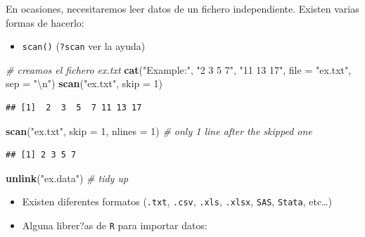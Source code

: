 \documentclass[]{book}
\newenvironment{Shaded}{\begin{snugshade}}{\end{snugshade}}
\newcommand{\KeywordTok}[1]{\textcolor[rgb]{0.13,0.29,0.53}{\textbf{#1}}}
\newcommand{\DataTypeTok}[1]{\textcolor[rgb]{0.13,0.29,0.53}{#1}}
\newcommand{\DecValTok}[1]{\textcolor[rgb]{0.00,0.00,0.81}{#1}}
\newcommand{\CharTok}[1]{\textcolor[rgb]{0.31,0.60,0.02}{#1}}
\newcommand{\StringTok}[1]{\textcolor[rgb]{0.31,0.60,0.02}{#1}}
\newcommand{\CommentTok}[1]{\textcolor[rgb]{0.56,0.35,0.01}{\textit{#1}}}
\newcommand{\NormalTok}[1]{#1}
\providecommand{\tightlist}{%
  \setlength{\itemsep}{0pt}\setlength{\parskip}{0pt}}
\begin{document}
En ocasiones, necesitaremos leer datos de un fichero independiente.
Existen varias formas de hacerlo:

\begin{itemize}
\tightlist
\item
  \texttt{scan()} (\texttt{?scan} ver la ayuda)
\end{itemize}

\begin{Shaded}
\begin{Highlighting}[]
\CommentTok{# creamos el fichero ex.txt}
\KeywordTok{cat}\NormalTok{(}\StringTok{"Example:"}\NormalTok{, }\StringTok{"2 3 5 7"}\NormalTok{, }\StringTok{"11 13 17"}\NormalTok{, }\DataTypeTok{file =} \StringTok{"ex.txt"}\NormalTok{, }\DataTypeTok{sep =} \StringTok{"}\CharTok{\textbackslash{}n}\StringTok{"}\NormalTok{) }
\KeywordTok{scan}\NormalTok{(}\StringTok{"ex.txt"}\NormalTok{, }\DataTypeTok{skip =} \DecValTok{1}\NormalTok{)}
\end{Highlighting}
\end{Shaded}

\begin{verbatim}
## [1]  2  3  5  7 11 13 17
\end{verbatim}

\begin{Shaded}
\begin{Highlighting}[]
\KeywordTok{scan}\NormalTok{(}\StringTok{"ex.txt"}\NormalTok{, }\DataTypeTok{skip =} \DecValTok{1}\NormalTok{, }\DataTypeTok{nlines =} \DecValTok{1}\NormalTok{) }\CommentTok{# only 1 line after the skipped one}
\end{Highlighting}
\end{Shaded}

\begin{verbatim}
## [1] 2 3 5 7
\end{verbatim}

\begin{Shaded}
\begin{Highlighting}[]
\KeywordTok{unlink}\NormalTok{(}\StringTok{"ex.data"}\NormalTok{) }\CommentTok{# tidy up}
\end{Highlighting}
\end{Shaded}

\begin{itemize}
\item
  Existen diferentes formatos (\texttt{.txt}, \texttt{.csv},
  \texttt{.xls}, \texttt{.xlsx}, \texttt{SAS}, \texttt{Stata},
  etc\ldots{})
\item
  Alguna librer?as de \texttt{R} para importar datos:
\end{itemize}
\end{document}
